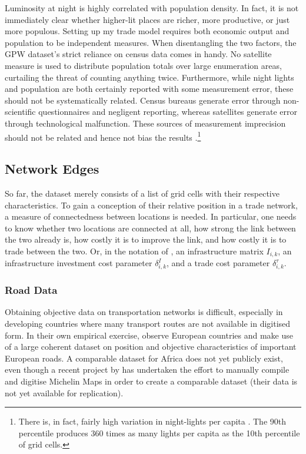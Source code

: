 \documentclass[11pt, oneside]{article}   	%
\begin{document}
Luminosity at night is highly correlated with population density. In fact, it is not immediately clear whether higher-lit places are richer, more productive, or just more populous. Setting up my trade model requires both economic output and population to be independent measures. When disentangling the two factors, the GPW dataset's strict reliance on census data comes in handy. No satellite measure is used to distribute population totals over large enumeration areas, curtailing the threat of counting anything twice. Furthermore, while night lights and population are both certainly reported with some measurement error, these should not be systematically related. Census bureaus generate error through non-scientific questionnaires and negligent reporting, whereas satellites generate error through technological malfunction. These sources of measurement imprecision should not be related and hence not bias the results \citep[see also][]{Pinkovskiy_LightsCameraIncome_2016}.\footnote{There is, in fact, fairly high variation in night-lights per capita \citep[a measure which should be employed with scientific caution and is only reported here for illustrative purposes, see][]{michalopoulos_spatial_2018}. The 90th percentile produces 360 times as many lights per capita as the 10th percentile of grid cells.}

\subsection{Network Edges}
So far, the dataset merely consists of a list of grid cells with their respective characteristics. To gain a conception of their relative position in a trade network, a measure of connectedness between locations is needed. In particular, one needs to know whether two locations are connected at all, how strong the link between the two already is, how costly it is to improve the link, and how costly it is to trade between the two. Or, in the notation of \cite{fajgelbaum_optimal_2017}, an infrastructure matrix $I_{i,k}$, an infrastructure investment cost parameter $\delta_{i,k}^{I}$, and a trade cost parameter $\delta_{i,k}^{\tau}$.

\subsubsection{Road Data}
\label{sec:road_data}
Obtaining objective data on transportation networks is difficult, especially in developing countries where many transport routes are not available in digitised form. In their own empirical exercise, \citeauthor{fajgelbaum_optimal_2017} observe European countries and make use of a large coherent dataset on position and objective characteristics of important European roads. A comparable dataset for Africa does not yet publicly exist, even though a recent project by \cite{jedwab_average_2017} has undertaken the effort to manually compile and digitise Michelin Maps in order to create a comparable dataset (their data is not yet available for replication).
\end{document}
